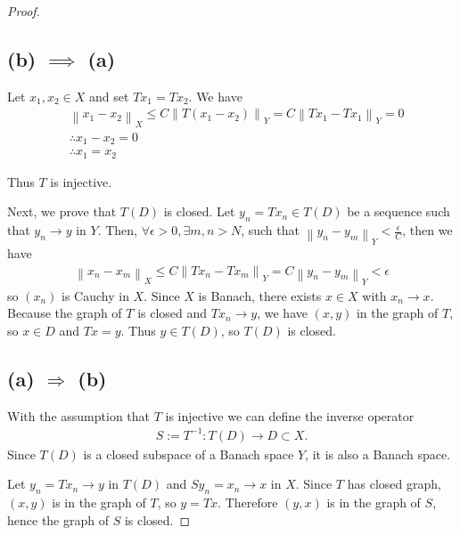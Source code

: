 \documentclass{article}
\newcommand{\norm}[1]{\left\|#1\right\|}
\begin{document}
\begin{proof}

    \subsection*{(b) $\implies$ (a)}

    Let $x_1, x_2 \in X$ and set $Tx_1 = Tx_2$. We have
    \begin{align}
        &\norm{x_1 - x_2}_X 
        \le C \norm{T(x_1 - x_2)}_Y
        = C \norm{Tx_1 - Tx_1}_Y
        = 0
        \\
        &\therefore x_1 - x_2 = 0
        \\
        &\therefore x_1 = x_2
    \end{align}

    Thus $ T $ is injective.

    Next, we prove that $ T(D) $ is closed.
    Let $ y_n = T x_n \in T(D) $ be a sequence such that $ y_n \to y $ in $ Y $.
    Then, $\forall \epsilon > 0, \exists m,n > N$, such that $\norm{y_n - y_m}_Y < \frac{\epsilon}{C}$, then we have
    \begin{align}
        \norm{x_n - x_m}_X 
        \le C \norm{T x_n - T x_m}_Y 
        = C \norm{y_n - y_m}_Y
        < \epsilon
    \end{align}
    so $ (x_n) $ is Cauchy in $ X $. Since $ X $ is Banach, there exists $ x \in X $ with $ x_n \to x $.
    Because the graph of $ T $ is closed and $ T x_n \to y $, we have $ (x, y) $ in the graph of $ T $,
    so $ x \in D $ and $ T x = y $. Thus $ y \in T(D) $, so $ T(D) $ is closed.

    \bigskip

    \subsection*{(a) $\Rightarrow$ (b)}
    With the assumption that $ T $ is injective we can define the inverse operator
    \begin{align}
        S := T^{-1} : T(D) \to D \subset X.
    \end{align}
    Since $ T(D) $ is a closed subspace of a Banach space $ Y $, it is also a Banach space.

    Let $ y_n = T x_n \to y $ in $ T(D) $ and $ S y_n = x_n \to x $ in $ X $. 
    Since $ T $ has closed graph, $ (x, y) $ is in the graph of $ T $,
    so $ y = T x $. Therefore $ (y, x) $ is in the graph of $ S $, hence the graph of $ S $ is closed.


\end{proof}
\end{document}
